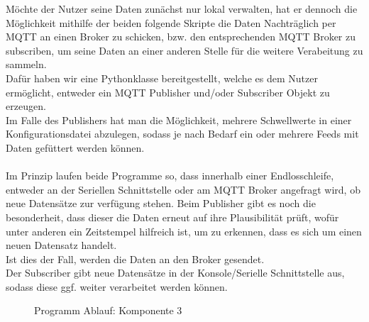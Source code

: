 Möchte der Nutzer seine Daten zunächst nur lokal verwalten, hat er dennoch die Möglichkeit mithilfe der beiden folgende Skripte die Daten Nachträglich per MQTT an einen Broker zu schicken, bzw. den entsprechenden MQTT Broker zu subscriben, um seine Daten an einer anderen Stelle für die weitere Verabeitung zu sammeln.\\
Dafür haben wir eine Pythonklasse bereitgestellt, welche es dem Nutzer ermöglicht, entweder ein MQTT Publisher und/oder Subscriber Objekt zu erzeugen.\\
Im Falle des Publishers hat man die Möglichkeit, mehrere Schwellwerte in einer Konfigurationsdatei abzulegen, sodass je nach Bedarf ein oder mehrere Feeds mit Daten gefüttert werden können.\\\\
Im Prinzip laufen beide Programme so, dass innerhalb einer Endlosschleife, entweder an der Seriellen Schnittstelle oder am MQTT Broker angefragt wird, ob neue Datensätze zur verfügung stehen. Beim Publisher gibt es noch die besonderheit, dass dieser die Daten erneut auf ihre Plausibilität prüft, wofür unter anderen ein Zeitstempel hilfreich ist, um zu erkennen, dass es sich um einen neuen Datensatz handelt.\\
Ist dies der Fall, werden die Daten an den Broker gesendet.\\
Der Subscriber gibt neue Datensätze in der Konsole/Serielle Schnittstelle aus, sodass diese ggf. weiter verarbeitet werden können.

\begin{center}
	\begin{figure}[h]
	 
	 \noindent{}
	 \caption[PAP komponente 3]{Programm Ablauf: Komponente 3}
	 \label{fig:MQTTpubsub}
	\end{figure}
\end{center}


